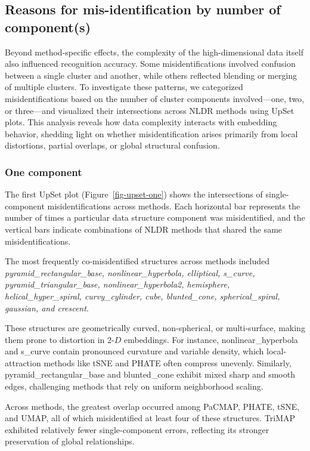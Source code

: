 \documentclass[
  11pt,
  a4paper,
]{report}
\newcommand\gD{$2\text{-}D$}
\begin{document}
\subsection{Reasons for mis-identification by number of
component(s)}\label{reasons-for-mis-identification-by-number-of-components}

Beyond method-specific effects, the complexity of the high-dimensional
data itself also influenced recognition accuracy. Some
misidentifications involved confusion between a single cluster and
another, while others reflected blending or merging of multiple
clusters. To investigate these patterns, we categorized
misidentifications based on the number of cluster components
involved---one, two, or three---and visualized their intersections
across NLDR methods using UpSet plots. This analysis reveals how data
complexity interacts with embedding behavior, shedding light on whether
misidentification arises primarily from local distortions, partial
overlaps, or global structural confusion.

\subsubsection{One component}\label{one-component}

The first UpSet plot (Figure~\ref{fig-upset-one}) shows the
intersections of single-component misidentifications across methods.
Each horizontal bar represents the number of times a particular data
structure component was misidentified, and the vertical bars indicate
combinations of NLDR methods that shared the same misidentifications.

The most frequently co-misidentified structures across methods included
\emph{pyramid\_rectangular\_base, nonlinear\_hyperbola, elliptical,
s\_curve, pyramid\_triangular\_base, nonlinear\_hyperbola2, hemisphere,
helical\_hyper\_spiral, curvy\_cylinder, cube, blunted\_cone,
spherical\_spiral, gaussian, and crescent}.

These structures are geometrically curved, non-spherical, or
multi-surface, making them prone to distortion in \gD{} embeddings. For
instance, nonlinear\_hyperbola and s\_curve contain pronounced curvature
and variable density, which local-attraction methods like tSNE and PHATE
often compress unevenly. Similarly, pyramid\_rectangular\_base and
blunted\_cone exhibit mixed sharp and smooth edges, challenging methods
that rely on uniform neighborhood scaling.

Across methods, the greatest overlap occurred among PaCMAP, PHATE, tSNE,
and UMAP, all of which misidentified at least four of these structures.
TriMAP exhibited relatively fewer single-component errors, reflecting
its stronger preservation of global relationships.
\end{document}
